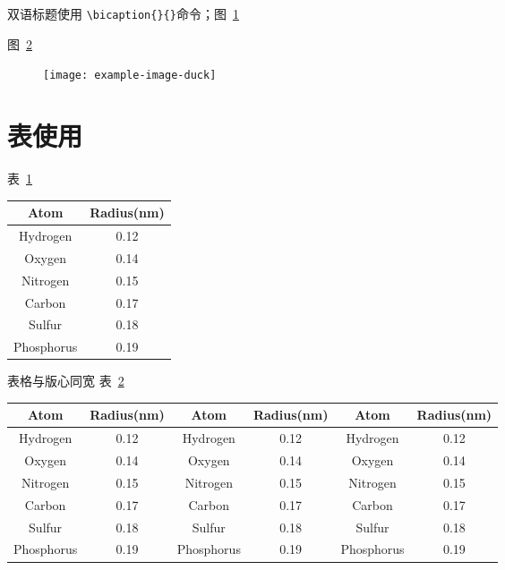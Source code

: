 \documentclass{BFSU-master-thesis}
\begin{document}
双语标题使用 \verb|\bicaption{}{}|命令；图~\ref{fig2-1}

\begin{figure}[h!t]
\centering
{}\quad
{}
\label{fig2-1}
\end{figure}

图~\ref{fig2-2}

\begin{figure}[h!t]
\centering
\texttt{[image: example-image-duck]}
\label{fig2-2}
\end{figure}

\section{表使用}

表~\ref{tab1}

\begin{table}[h!t]
\centering
{}
\label{tab1}
\begin{tabular}{cc}
\toprule
Atom       & Radius(nm) \\
\midrule
Hydrogen   & 0.12       \\
Oxygen     & 0.14       \\
Nitrogen   & 0.15       \\
Carbon     & 0.17       \\
Sulfur     & 0.18       \\
Phosphorus & 0.19       \\
\bottomrule
\end{tabular}
\end{table}

表格与版心同宽 表~\ref{tab2}

\begin{table}[h!t]
\centering
{}
\label{tab2}
\begin{tabular*}{\linewidth}{@{\extracolsep{\fill}}cccccc}
\toprule
Atom       & Radius(nm) & Atom       & Radius(nm) & Atom       & Radius(nm) \\
\midrule
Hydrogen   & 0.12       & Hydrogen   & 0.12       & Hydrogen   & 0.12       \\
Oxygen     & 0.14       & Oxygen     & 0.14       & Oxygen     & 0.14       \\
Nitrogen   & 0.15       & Nitrogen   & 0.15       & Nitrogen   & 0.15       \\
Carbon     & 0.17       & Carbon     & 0.17       & Carbon     & 0.17       \\
Sulfur     & 0.18       & Sulfur     & 0.18       & Sulfur     & 0.18       \\
Phosphorus & 0.19       & Phosphorus & 0.19       & Phosphorus & 0.19       \\
\bottomrule
\end{tabular*}
\end{table}
\end{document}
